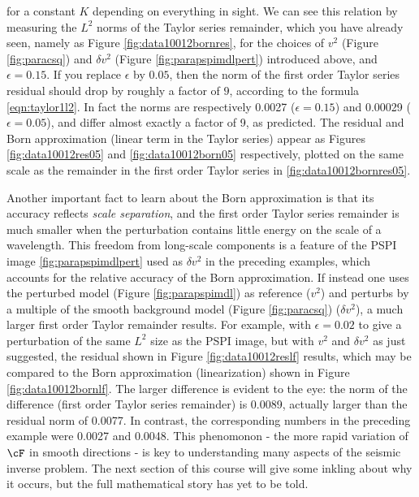 for a constant $K$ depending on everything in sight. We can see this relation by measuring the $L^2$ norms of the Taylor series remainder, which you have already seen, namely as Figure \ref{fig:data10012bornres}, for the choices of $v^2$ (Figure \ref{fig:paracsq}) and $\delta v^2$ (Figure \ref{fig:parapspimdlpert}) introduced above, and $\epsilon = 0.15$. If you replace $\epsilon$ by $0.05$, then the norm of the first order Taylor series residual should drop by roughly a factor of $9$, according to the formula \ref{eqn:taylor1l2}. In fact the norms are respectively 0.0027 ($\epsilon=0.15$) and 0.00029 ($\epsilon = 0.05$), and differ almost exactly a factor of 9, as predicted. The residual and Born approximation (linear term in the Taylor series) appear as Figures \ref{fig:data10012res05} and \ref{fig:data10012born05} respectively, plotted on the same scale as the remainder in the first order Taylor series in \ref{fig:data10012bornres05}.




Another important fact to learn about the Born approximation is that its accuracy reflects {\em scale separation}, and the first order Taylor series remainder is much smaller when the perturbation contains little energy on the scale of a wavelength. This freedom from long-scale components is a feature of the PSPI image \ref{fig:parapspimdlpert} used as $\delta v^2$ in the preceding examples, which accounts for the relative accuracy of the Born approximation. If instead one uses the perturbed model (Figure \ref{fig:parapspimdl}) as reference ($v^2$) and perturbs by a multiple of the smooth background model (Figure \ref{fig:paracsq}) ($\delta v^2$), a much larger first order Taylor remainder results. For example, with $\epsilon = 0.02$ to give a perturbation of the same $L^2$ size as the PSPI image, but with $v^2$ and $\delta v^2$ as just suggested, the residual shown in Figure \ref{fig:data10012reslf} results, which may be compared to the Born approximation (linearization) shown in Figure \ref{fig:data10012bornlf}. The larger difference is evident to the eye: the norm of the difference (first order Taylor series remainder) is 0.0089, actually larger than the residual norm of 0.0077.  In contrast, the corresponding numbers in the preceding example were 0.0027  and 0.0048. This phenomonon - the more rapid variation of $\cF$ in smooth directions - is key to understanding many aspects of the seismic inverse problem. The next section of this course will give some inkling about why it occurs, but the full mathematical story has yet to be told.

